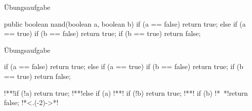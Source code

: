 \begin{frame}[fragile]{Übungsaufgabe}\onslide<+->%
    \begin{exercise*}
        \begin{plainjava}
public boolean nand(boolean a, boolean b) {
    if (a == false) return true;
    else if (a == true) {
        if (b == false) return true;
        if (b == true) return false;
    }
}
        \end{plainjava}
    \end{exercise*}
\end{frame}
\begin{frame}[fragile]{Übungsaufgabe}\onslide<+->%
    \begin{solve*}
    \vspace{-\abovedisplayskip}
    \begin{minipage}[t]{0.5\linewidth}\raggedright
        \begin{plainjava}
if (a == false) return true;
else if (a == true) {
    if (b == false) return true;
    if (b == true) return false;
}
        \end{plainjava}
    \end{minipage}\begin{minipage}[t]{0.5\linewidth}\raggedright
        \begin{plainjava}
!*\onslide<+->*!if (!a) return true;
!*\onslide<+->*!else if (a) {
!*\onslide<+->*!    if (!b) return true;
!*\onslide<+->*!    if (b)  !*~*!return false;
!*\onslide<.(-2)->*!}
        \end{plainjava}
    \end{minipage}
    \end{solve*}
\end{frame}
